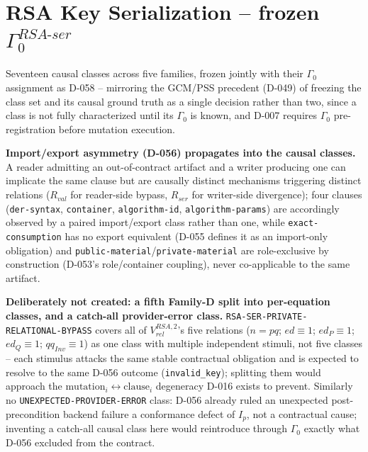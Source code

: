 \documentclass[11pt,a4paper]{article}
\begin{document}
\section{RSA Key Serialization -- frozen \texorpdfstring{$\Gamma_0^{RSA\text{-}ser}$}{Gamma-0 RSA-ser}}\label{sec:rsa-ser-gamma0}
Seventeen causal classes across five families, frozen jointly with their $\Gamma_0$ assignment as D-058 -- mirroring the GCM/PSS precedent (D-049) of freezing the class set and its causal ground truth as a single decision rather than two, since a class is not fully characterized until its $\Gamma_0$ is known, and D-007 requires $\Gamma_0$ pre-registration before mutation execution.

\textbf{Import/export asymmetry (D-056) propagates into the causal classes.} A reader admitting an out-of-contract artifact and a writer producing one can implicate the same clause but are causally distinct mechanisms triggering distinct relations ($R_{val}$ for reader-side bypass, $R_{ser}$ for writer-side divergence); four clauses (\texttt{der-syntax}, \texttt{container}, \texttt{algorithm-id}, \texttt{algorithm-params}) are accordingly observed by a paired import/export class rather than one, while \texttt{exact-consumption} has no export equivalent (D-055 defines it as an import-only obligation) and \texttt{public-material}/\texttt{private-material} are role-exclusive by construction (D-053's role/container coupling), never co-applicable to the same artifact.

\textbf{Deliberately not created: a fifth Family-D split into per-equation classes, and a catch-all provider-error class.} \texttt{RSA-SER-PRIVATE-RELATIONAL-BYPASS} covers all of $V_{rel}^{RSA,2}$'s five relations ($n=pq$; $ed\equiv1$; $ed_P\equiv1$; $ed_Q\equiv1$; $qq_{Inv}\equiv1$) as one class with multiple independent stimuli, not five classes -- each stimulus attacks the same stable contractual obligation and is expected to resolve to the same D-056 outcome (\texttt{invalid\_key}); splitting them would approach the $\text{mutation}_i \leftrightarrow \text{clause}_i$ degeneracy D-016 exists to prevent. Similarly no \texttt{UNEXPECTED-PROVIDER-ERROR} class: D-056 already ruled an unexpected post-precondition backend failure a conformance defect of $I_p$, not a contractual cause; inventing a catch-all causal class here would reintroduce through $\Gamma_0$ exactly what D-056 excluded from the contract.
\end{document}
